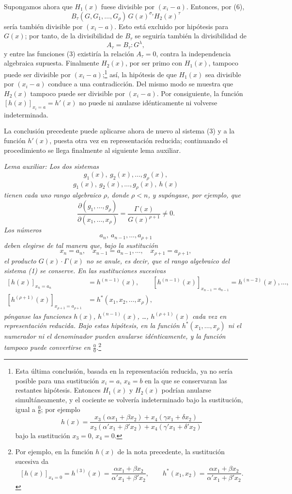 \documentclass[11pt]{article}
\begin{document}
Supongamos ahora que $H_1(x)$ fuese divisible por $(x_i-a)$. Entonces, por (6),
\[
  B_\tau(G,G_1,\ldots,G_\rho)\,G(x)^{\sigma_\tau}H_2(x)^\tau
\]
sería también divisible por $(x_i-a)$. Esto está excluido por hipótesis para $G(x)$; por tanto, de la divisibilidad de $B_\tau$ se seguiría también la divisibilidad de
\[
  A_\tau=B_\tau:G^\lambda,
\]
y entre las funciones (3) existiría la relación $A_\tau=0$, contra la independencia algebraica supuesta. Finalmente $H_2(x)$, por ser primo con $H_1(x)$, tampoco puede ser divisible por $(x_i-a)$;\footnote{Esta última conclusión, basada en la representación reducida, ya no sería posible para una sustitución $x_i=a$, $x_k=b$ en la que se conservaran las restantes hipótesis. Entonces $H_1(x)$ y $H_2(x)$ podrían anularse simultáneamente, y el cociente se volvería indeterminado bajo la sustitución, igual a $\frac{0}{0}$; por ejemplo
\[
 h(x)=\frac{x_3(\alpha x_1+\beta x_2)+x_4(\gamma x_1+\delta x_2)}
 {x_3(\alpha' x_1+\beta' x_2)+x_4(\gamma' x_1+\delta' x_2)}
\]
bajo la sustitución $x_3=0$, $x_4=0$.} así, la hipótesis de que $H_1(x)$ sea divisible por $(x_i-a)$ conduce a una contradicción. Del mismo modo se muestra que $H_2(x)$ tampoco puede ser divisible por $(x_i-a)$. Por consiguiente, la función $[h(x)]_{x_i=a}=h'(x)$ no puede ni anularse idénticamente ni volverse indeterminada.

La conclusión precedente puede aplicarse ahora de nuevo al sistema (3) y a la función $h'(x)$, puesta otra vez en representación reducida; continuando el procedimiento se llega finalmente al siguiente lema auxiliar.

\emph{Lema auxiliar: Los dos sistemas}
\[
  g_1(x),\ g_2(x),\ldots,g_\rho(x),
\]
\[
  g_1(x),\ g_2(x),\ldots,g_\rho(x),\ h(x)
\]
\emph{tienen cada uno rango algebraico $\rho$, donde $\rho<n$, y supóngase, por ejemplo, que}
\[
 \frac{\partial(g_1,\ldots,g_\rho)}{\partial(x_1,\ldots,x_\rho)}
 =\frac{\Gamma(x)}{G(x)^{\rho+1}}\ne0.
\]
\emph{Los números}
\[
  a_n,\ a_{n-1},\ldots,a_{\rho+1}
\]
\emph{deben elegirse de tal manera que, bajo la sustitución}
\[
  x_n=a_n,\quad x_{n-1}=a_{n-1},\ldots,\quad x_{\rho+1}=a_{\rho+1},
\]
\emph{el producto $G(x)\cdot\Gamma(x)$ no se anule, es decir, que el rango algebraico del sistema (1) se conserve. En las sustituciones sucesivas}
\[
\begin{aligned}
 [h(x)]_{x_n=a_n}&=h^{(n-1)}(x),\qquad
 [h^{(n-1)}(x)]_{x_{n-1}=a_{n-1}}=h^{(n-2)}(x),\ldots,\\
 [h^{(\rho+1)}(x)]_{x_{\rho+1}=a_{\rho+1}}&=h^*(x_1,x_2,\ldots,x_\rho),
\end{aligned}
\]
\emph{pónganse las funciones $h(x)$, $h^{(n-1)}(x)$, \ldots, $h^{(\rho+1)}(x)$ cada vez en representación reducida. Bajo estas hipótesis, en la función $h^*(x_1,\ldots,x_\rho)$ ni el numerador ni el denominador pueden anularse idénticamente, y la función tampoco puede convertirse en $\frac{0}{0}$.}\footnote{Por ejemplo, en la función $h(x)$ de la nota precedente, la sustitución sucesiva da
\[
 [h(x)]_{x_4=0}=h^{(3)}(x)=\frac{\alpha x_1+\beta x_2}{\alpha' x_1+\beta' x_2},\qquad
 h^*(x_1,x_2)=\frac{\alpha x_1+\beta x_2}{\alpha' x_1+\beta' x_2}.
\]}
\end{document}
